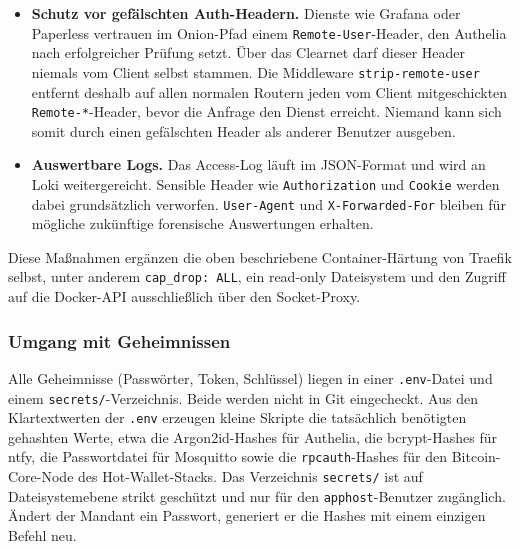\begin{itemize}
    \texttt{security-headers} setzt Traefik sicherheitsrelevante Header wie
    \texttt{Content-Security-Policy}, \texttt{X-Frame-Options},\\
    \texttt{X-Content-Type-Options: nosniff}, eine restriktive Referrer- und
    Permissions-Policy (deaktiviert unter anderem Kamera, Mikrofon und
    Standort) sowie Cross-Origin-Opener-, Embedder- und Resource-Policy.
    Gleichzeitig werden \texttt{Server}- und \texttt{X-Powered-By}-Header
    geleert, damit Angreifer aus einer Antwort nicht ableiten können, welche
    Software in welcher Version dahintersteht. Ein
    \texttt{X-Robots-Tag: noindex} verringert außerdem das Risiko, dass
    interne Dienste in Suchmaschinen erscheinen.
  \item \textbf{Schutz vor gefälschten Auth-Headern.} Dienste wie Grafana
    oder Paperless vertrauen im Onion-Pfad einem
    \texttt{Remote-User}-Header, den Authelia nach erfolgreicher Prüfung
    setzt. Über das Clearnet darf dieser Header niemals vom Client selbst
    stammen. Die Middleware \texttt{strip-remote-user} entfernt deshalb auf
    allen normalen Routern jeden vom Client mitgeschickten
    \texttt{Remote-*}-Header, bevor die Anfrage den Dienst erreicht. Niemand
    kann sich somit durch einen gefälschten Header als anderer Benutzer
    ausgeben.
  \item \textbf{Auswertbare Logs.} Das Access-Log läuft im \ac{JSON}-Format
    und wird an Loki weitergereicht. Sensible Header wie
    \texttt{Authorization} und \texttt{Cookie} werden dabei grundsätzlich
    verworfen. \texttt{User-Agent} und \texttt{X-Forwarded-For} bleiben für
    mögliche zukünftige forensische Auswertungen erhalten.
\end{itemize}

Diese Maßnahmen ergänzen die oben beschriebene Container-Härtung von Traefik
selbst, unter anderem \texttt{cap\_drop: ALL}, ein read-only Dateisystem und
den Zugriff auf die Docker-\ac{API} ausschließlich über den Socket-Proxy.


\subsubsection{Umgang mit Geheimnissen}
Alle Geheimnisse (Passwörter, Token, Schlüssel) liegen in einer
\texttt{.env}-Datei und einem \texttt{secrets/}-Verzeichnis. Beide werden
nicht in Git eingecheckt. Aus den Klartextwerten der \texttt{.env} erzeugen
kleine Skripte die tatsächlich benötigten gehashten Werte, etwa die
Argon2id-Hashes für Authelia, die bcrypt-Hashes für ntfy, die Passwortdatei
für Mosquitto sowie die \texttt{rpcauth}-Hashes für den Bitcoin-Core-Node des
Hot-Wallet-Stacks. Das Verzeichnis \texttt{secrets/} ist auf
Dateisystemebene strikt geschützt und nur für den \texttt{apphost}-Benutzer
zugänglich. Ändert der Mandant ein Passwort, generiert er die Hashes mit
einem einzigen Befehl neu.

